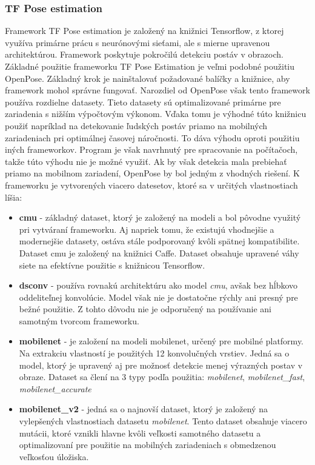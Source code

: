 \documentclass[slovak,master,dept460,male,cpp,cpdeclaration]{diploma}
\begin{document}
\subsubsection*{TF Pose estimation}
\label{sec:tf_pose}
Framework TF Pose estimation je založený na knižnici Tensorflow, z ktorej využíva primárne prácu s neurónovými sieťami, ale s mierne upravenou architektúrou. Framework poskytuje pokročilú detekciu postáv v obrazoch. Základné použitie frameworku TF Pose Estimation je veľmi podobné použitiu OpenPose. Základný krok je nainštalovať požadované balíčky a knižnice, aby framework mohol správne fungovať. Narozdiel od OpenPose však tento framework používa rozdielne datasety. Tieto datasety sú optimalizované primárne pre zariadenia s nižším výpočtovým výkonom. Vďaka tomu je výhodné túto knižnicu použiť napríklad na detekovanie ľudských postáv priamo na mobilných zariadeniach pri optimálnej časovej náročnosti. To dáva výhodu oproti použitiu iných frameworkov. Program je však navrhnutý pre spracovanie na   počítačoch, takže túto výhodu nie je možné využiť. Ak by však detekcia mala prebiehať priamo na mobilnom zariadení, OpenPose by bol jedným z vhodných riešení. K frameworku je vytvorených viacero datesetov, ktoré sa v určitých vlastnostiach líšia:

 \begin{itemize}
\item \textbf{cmu} - základný dataset, ktorý je založený na modeli a bol pôvodne využitý pri vytváraní frameworku. Aj napriek tomu, že  existujú vhodnejšie a modernejšie  datasety, ostáva stále podporovaný kvôli spätnej kompatibilite. Dataset cmu je založený na knižnici Caffe. Dataset obsahuje upravené váhy siete na efektívne použitie s knižnicou Tensorflow.
\item \textbf{dsconv} - používa rovnakú architektúru ako model \textit{cmu}, avšak bez hĺbkovo oddeliteľnej konvolúcie. Model však nie je dostatočne rýchly ani presný pre bežné použitie. Z tohto dôvodu nie je odporučený na používanie ani samotným tvorcom frameworku.
\item \textbf{mobilenet} - je založení na modeli mobilenet, určený pre mobilné platformy. Na extrakciu  vlastností je použitých 12 konvolučných vrstiev. Jedná sa o model, ktorý je upravený aj pre  možnosť detekcie menej výrazných postav v obraze. Dataset sa člení  na 3 typy podľa použitia: \textit{mobilenet}, \textit{mobilenet\_fast}, \textit{mobilenet\_accurate}
\item \textbf{mobilenet\_v2} - jedná sa o najnovší dataset, ktorý je založený na vylepšených vlastnostiach datasetu \textit{mobilenet}. Tento dataset obsahuje viacero mutácii, ktoré  vznikli hlavne kvôli veľkosti samotného datasetu a optimalizovaní pre použitie na mobilných zariadeniach s obmedzenou veľkosťou úložiska.
\end{itemize}
\end{document}
